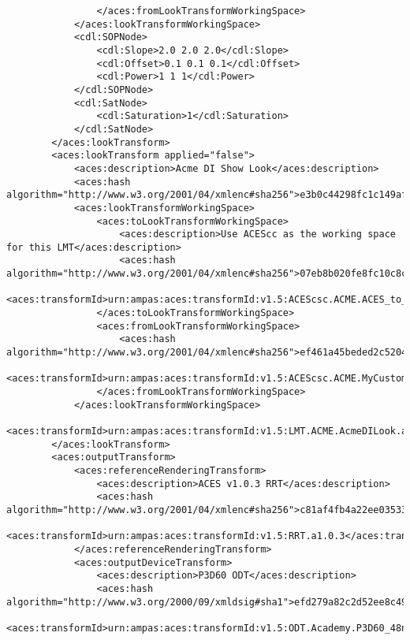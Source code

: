 \begin{lstlisting}
                </aces:fromLookTransformWorkingSpace>
            </aces:lookTransformWorkingSpace>
            <cdl:SOPNode>
                <cdl:Slope>2.0 2.0 2.0</cdl:Slope>
                <cdl:Offset>0.1 0.1 0.1</cdl:Offset>
                <cdl:Power>1 1 1</cdl:Power>
            </cdl:SOPNode>
            <cdl:SatNode>
                <cdl:Saturation>1</cdl:Saturation>
            </cdl:SatNode>
        </aces:lookTransform>
        <aces:lookTransform applied="false">
            <aces:description>Acme DI Show Look</aces:description>
            <aces:hash algorithm="http://www.w3.org/2001/04/xmlenc#sha256">e3b0c44298fc1c149afbf4c8996fb92427ae41e4649b934ca495991b7852b855</aces:hash>
            <aces:lookTransformWorkingSpace>
                <aces:toLookTransformWorkingSpace>
                    <aces:description>Use ACEScc as the working space for this LMT</aces:description>
                    <aces:hash algorithm="http://www.w3.org/2001/04/xmlenc#sha256">07eb8b020fe8fc10c8c4b983cc37798324c7eee1319f07dd0028fca96f904a7f</aces:hash>
                    <aces:transformId>urn:ampas:aces:transformId:v1.5:ACEScsc.ACME.ACES_to_MyCustomLogSpace.a1.v1</aces:transformId>
                </aces:toLookTransformWorkingSpace>
                <aces:fromLookTransformWorkingSpace>
                    <aces:hash algorithm="http://www.w3.org/2001/04/xmlenc#sha256">ef461a45beded2c5204371f755ca2558e61743f288f3ccd719ce1de23ebcf9cb</aces:hash>
                    <aces:transformId>urn:ampas:aces:transformId:v1.5:ACEScsc.ACME.MyCustomLogSpace_to_ACES.a1.v1</aces:transformId>
                </aces:fromLookTransformWorkingSpace>
            </aces:lookTransformWorkingSpace>
            <aces:transformId>urn:ampas:aces:transformId:v1.5:LMT.ACME.AcmeDILook.a1.v5</aces:transformId>
        </aces:lookTransform>
        <aces:outputTransform>
            <aces:referenceRenderingTransform>
                <aces:description>ACES v1.0.3 RRT</aces:description>
                <aces:hash algorithm="http://www.w3.org/2001/04/xmlenc#sha256">c81af4fb4a22ee0353308e4582708951df4682bf73f838c24bf44e585fc3bb61</aces:hash>
                <aces:transformId>urn:ampas:aces:transformId:v1.5:RRT.a1.0.3</aces:transformId>
            </aces:referenceRenderingTransform>
            <aces:outputDeviceTransform>
                <aces:description>P3D60 ODT</aces:description>
                <aces:hash algorithm="http://www.w3.org/2000/09/xmldsig#sha1">efd279a82c2d52ee8c49dc0793499dc86bb1a4a3fa0dfb420d59c2814c55aea6</aces:hash>
                <aces:transformId>urn:ampas:aces:transformId:v1.5:ODT.Academy.P3D60_48nits.a1.0.3</aces:transformId>

\end{lstlisting}
